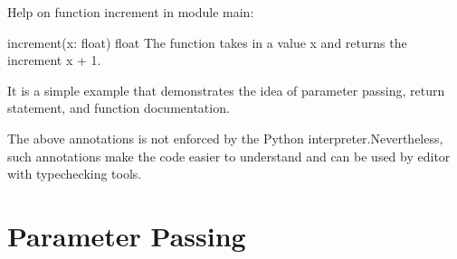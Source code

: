 \documentclass[letterpaper,10pt,english]{sphinxmanual}
\begin{document}
\begin{sphinxVerbatim}[commandchars=\\\{\}]
Help on function increment in module \PYGZus{}\PYGZus{}main\PYGZus{}\PYGZus{}:

increment(x: float) \PYGZhy{}\PYGZgt{} float
    The function takes in a value x and returns the increment x + 1.
    
    It is a simple example that demonstrates the idea of
    \PYGZhy{} parameter passing, 
    \PYGZhy{} return statement, and 
    \PYGZhy{} function documentation.
\end{sphinxVerbatim}

The above annotations is not enforced by the Python interpreter.Nevertheless, such annotations make the code easier to understand and can be used by editor with type\sphinxhyphen{}checking tools.

\begin{sphinxVerbatim}[commandchars=\\\{\}]
 
       
\end{sphinxVerbatim}

\begin{sphinxVerbatim}[commandchars=\\\{\}]
  
\end{sphinxVerbatim}


\section{Parameter Passing}
\label{\detokenize{Lecture4/Writing Functions:parameter-passing}}

\begin{sphinxVerbatim}[commandchars=\\\{\}]
 
      
\end{sphinxVerbatim}

\begin{sphinxVerbatim}[commandchars=\\\{\}]
  
  
\end{sphinxVerbatim}
\end{document}
